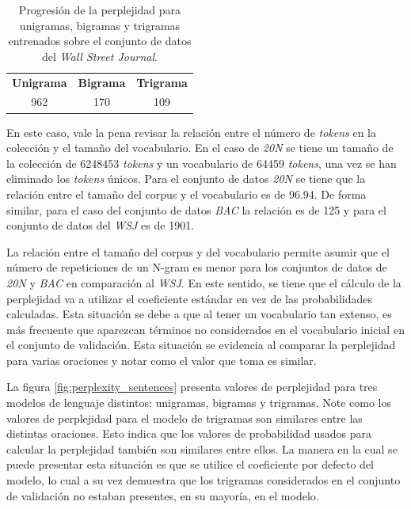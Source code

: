 \begin{table}[h]
    \centering
    \begin{tabular}{|c|c|c|}
        \textbf{Unigrama} & \textbf{Bigrama} & \textbf{Trigrama} \\
        962 & 170 & 109
    \end{tabular}
    \caption{Progresión de la perplejidad para unigramas, bigramas y trigramas entrenados sobre el conjunto de datos del \textit{Wall Street Journal}.}
    \label{tab:perplexity_wsj}
\end{table}

En este caso, vale la pena revisar la relación entre el número de \textit{tokens} en la colección y el tamaño del vocabulario. En el caso de \textit{20N} se tiene un tamaño de la colección de 6248453 \textit{tokens} y un vocabulario de 64459 \textit{tokens}, una vez se han eliminado los \textit{tokens} únicos. Para el conjunto de datos \textit{20N} se tiene que la relación entre el tamaño del corpus y el vocabulario es de 96.94. De forma similar, para el caso del conjunto de datos \textit{BAC} la relación es de 125 y para el conjunto de datos del \textit{WSJ} es de 1901. 

La relación entre el tamaño del corpus y del vocabulario permite asumir que el número de repeticiones de un N-gram es menor para los conjuntos de datos de \textit{20N} y \textit{BAC} en comparación al \textit{WSJ}. En este sentido, se tiene que el cálculo de la perplejidad va a utilizar el coeficiente estándar en vez de las probabilidades calculadas. Esta situación se debe a que al tener un vocabulario tan extenso, es más frecuente que aparezcan términos no considerados en el vocabulario inicial en el conjunto de validación. Esta situación se evidencia al comparar la perplejidad para varias oraciones y notar como el valor que toma es similar. 

La figura \ref{fig:perplexity_sentences} presenta valores de perplejidad para tres modelos de lenguaje distintos: unigramas, bigramas y trigramas. Note como los valores de perplejidad para el modelo de trigramas son similares entre las distintas oraciones. Esto indica que los valores de probabilidad usados para calcular la perplejidad también son similares entre ellos. La manera en la cual se puede presentar esta situación es que se utilice el coeficiente por defecto del modelo, lo cual a su vez demuestra que los trigramas considerados en el conjunto de validación no estaban presentes, en su mayoría, en el modelo.

